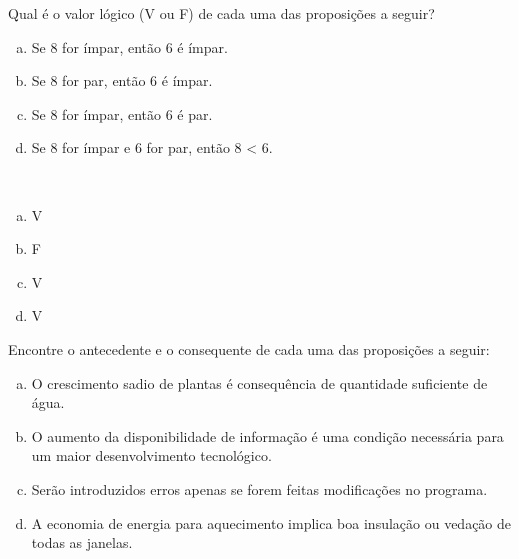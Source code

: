 \documentclass[a4paper, 12pt, addpoints]{exam}
\begin{document}
\begin{questions}
  \question  Qual é o valor lógico (V ou F) de cada uma das proposições a seguir?
  \begin{multicols}{2}
    \begin{enumerate}[a)]
      \item Se 8 for ímpar, então 6 é ímpar.
      \item Se 8 for par, então 6 é ímpar.
      \item Se 8 for ímpar, então 6 é par.
      \item Se 8 for ímpar e 6 for par, então 8 < 6.
    \end{enumerate}
  \end{multicols}

  \begin{resp}~
    \begin{multicols}{4}
      \begin{enumerate}[a)]
        \item V
        \item F
        \item V
        \item V
      \end{enumerate}
    \end{multicols}
  \end{resp}

  \question  Encontre o antecedente e o consequente de cada uma das proposições a seguir:

  \begin{enumerate}[a)]
    \item O crescimento sadio de plantas é consequência de quantidade suficiente de
          água.
    \item O aumento da disponibilidade de informação é uma condição necessária para
          um maior desenvolvimento tecnológico.
    \item Serão introduzidos erros apenas se forem feitas modificações no programa.
    \item A economia de energia para aquecimento implica boa insulação ou vedação
          de todas as janelas.
  \end{enumerate}


\end{questions}
\end{document}

